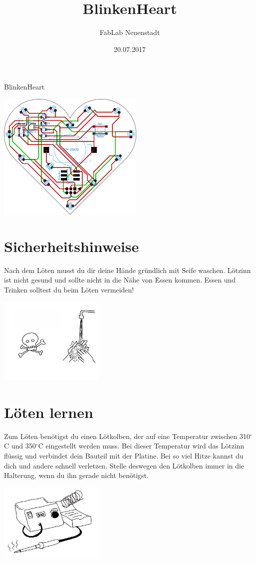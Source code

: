\documentclass{article} %
\title{BlinkenHeart}
\author{FabLab Neuenstadt}
\date{20.07.2017}
\begin{document}
\begin{center}
	{\LARGE BlinkenHeart}
\end{center}
\begin{center}
	\includegraphics[width=7cm]{Logo/Logo}
\end{center}

\newpage
\section{Sicherheitshinweise}
Nach dem Löten musst du dir deine Hände gründlich mit Seife
waschen. Lötzinn ist nicht gesund und sollte nicht in die Nähe von
Essen kommen. Essen und Trinken solltest du beim Löten vermeiden!
\begin{center}
\includegraphics[width=5cm]{-000}
\end{center}

\newpage
\section{Löten lernen}
Zum Löten benötigst du einen Lötkolben, der auf eine Temperatur
zwischen 310$^\circ$C und 350$^\circ$C eingestellt werden muss. Bei dieser
Temperatur wird das Lötzinn flüssig und verbindet dein Bauteil mit der
Platine. Bei so viel Hitze kannst du dich und andere schnell verletzen.
Stelle deswegen den Lötkolben immer in die Halterung, wenn du ihn
gerade nicht benötigst.
\begin{center}
	\includegraphics[width=5cm]{-002}
\end{center}
\end{document}
